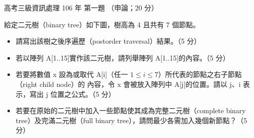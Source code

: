 \begin{pastexam}[label={px:gk3-106-ds-01}]{高考三級資訊處理 106 年 第一題}
（申論；20 分）

給定二元樹（binary tree）如下圖，樹高為 4 且共有 7 個節點。
\begin{center}
\end{center}
\begin{itemize}[leftmargin=2.2em]
\item[㈠] 請寫出該樹之後序遍歷（postorder traversal）結果。（5 分）
\item[㈡] 若以陣列 A[1..15]實作該二元樹，請列舉陣列 A[1..15]的內容。（5 分）
\item[㈢] 若要將數值 x 設為或取代 A[i]（任一 $1 \le i \le 7$）所代表的節點之右子節點（right child node）的
內容，令 x 會被放入陣列中 A[j]的位置。請以 j、i 表示，寫出 j 位置之公式。（5 分）
\item[㈣] 若要在原始的二元樹中加入一些節點使其成為完整二元樹（complete binary tree）及完滿二元樹（full
binary tree），請問最少各需加入幾個新節點？（5 分）
\end{itemize}
\end{pastexam}

